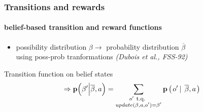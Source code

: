 \documentclass[12pt,svgnames,table]{beamer}
\newcommand{\paren}[1]{\left( \left. #1 \right. \right)}
\newcommand{\sachant}{\, \right| \left. \,}
\begin{document}
\begin{frame}
\frametitle{Transitions and rewards}
\framesubtitle{\footnotesize belief-based transition and reward functions}

\begin{itemize}
\item possibility distribution $\beta \rightarrow$ probability distribution $\overline{\beta}$\\ 
using poss-prob tranformations {\footnotesize \textit{(Dubois et al., FSS-92)}}%
\end{itemize}
\begin{block}{Transition function on belief states}
\[ \Rightarrow \textbf{p} \Big( \beta' \Big\vert \overline{\beta},a \Big) = \sum_{ \substack{ o' \mbox{ \footnotesize t.q. } \\ update(\beta,a,o')=\beta'} }\textbf{p}\paren{o'\sachant \overline{\beta},a}\]
\end{block}

\end{frame}
\end{document}
